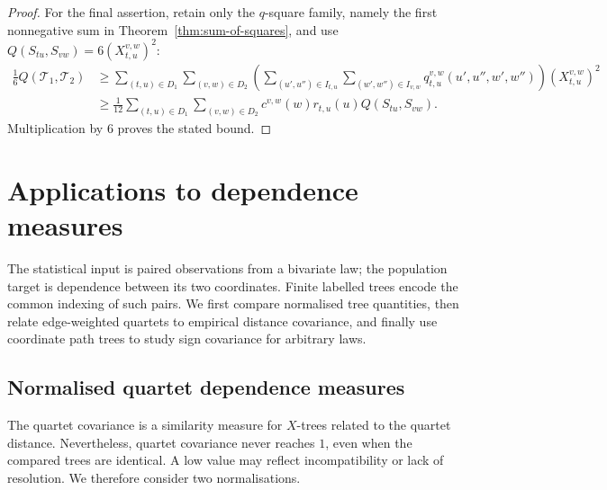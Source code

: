 \documentclass[12pt]{article}
\begin{document}
\begin{proof}
For the final assertion, retain only the $q$-square family, namely the first
nonnegative sum in Theorem~\ref{thm:sum-of-squares}, and use
$Q(S_{tu},S_{vw})=6(X_{t,u}^{v,w})^2$:
\begin{equation}\label{eq:display-065}
\begin{aligned}
\frac16Q(\mathcal T_1,\mathcal T_2)
&\ge\sum_{(t,u)\in D_1}\sum_{(v,w)\in D_2}
\left(
\sum_{(u',u'')\in I_{t,u}}
\sum_{(w',w'')\in I_{v,w}}
q_{t,u}^{v,w}(u',u'',w',w'')
\right)
(X_{t,u}^{v,w})^2\\
&\ge\frac1{12}\sum_{(t,u)\in D_1}\sum_{(v,w)\in D_2}
c^{v,w}(w)r_{t,u}(u)Q(S_{tu},S_{vw}).
\end{aligned}
\end{equation}
Multiplication by $6$ proves the stated bound.
\end{proof}

\section{Applications to dependence measures}
\label{sec:statistical-consequences}

The statistical input is paired observations from a bivariate law; the
population target is dependence between its two coordinates.  Finite
labelled trees encode the common indexing of such pairs.  We first compare
normalised tree quantities, then relate edge-weighted quartets to empirical
distance covariance, and finally use coordinate path trees to study sign
covariance for arbitrary laws.

\subsection{Normalised quartet dependence measures}

The quartet covariance is a similarity measure for $X$-trees related to the
quartet distance.  Nevertheless, quartet covariance never reaches
$1$, even when the compared trees are identical.  A low value may reflect
incompatibility or lack of resolution.  We therefore consider two
normalisations.
\end{document}
